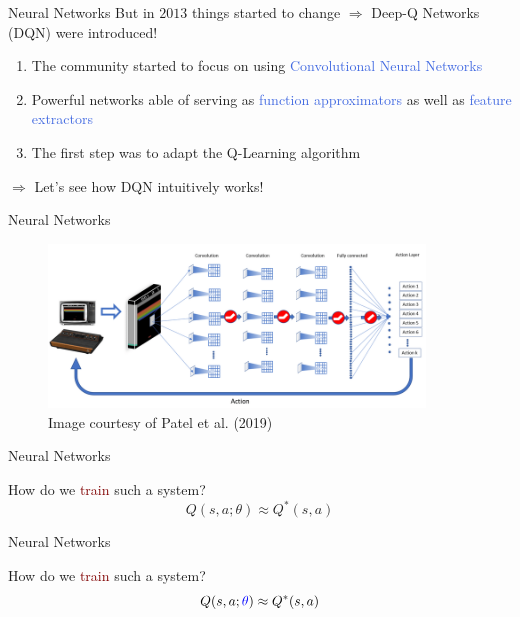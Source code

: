 \documentclass{beamer}
\begin{document}
\begin{frame}{Neural Networks}
	But in $2013$ things started to change $\Rightarrow$ \textcolor{skymagenta}{Deep-Q Networks} (DQN) were introduced!

	\begin{enumerate}
		\item The community started to focus on using \textcolor{RoyalBlue}{Convolutional Neural Networks}
		\item Powerful networks able of serving as \textcolor{RoyalBlue}{function approximators} as well as \textcolor{RoyalBlue}{feature extractors}
		\item The first step was to adapt the Q-Learning algorithm 
	\end{enumerate}
	
	\bigskip 

	$\Rightarrow$ Let's see how DQN intuitively works!

\end{frame}


\begin{frame}{Neural Networks}

	\begin{figure}
		\centering
		\includegraphics[width=10cm]{./Images/dqn}
		\caption{Image courtesy of Patel et al. (2019)}
	\end{figure}

\end{frame}

\begin{frame}{Neural Networks}
	\begin{center}
		How do we \textcolor{Maroon}{train} such a system?
		\begin{equation*}  
			Q(s,a;\theta)\approx Q^{*}(s,a)
		\end{equation*}
	\end{center}
\end{frame}



\begin{frame}{Neural Networks}
	\begin{center}
		How do we \textcolor{Maroon}{train} such a system?
		\begin{equation*}  
			Q(s,a; \textcolor{blue}{\theta})\approx Q^{*}(s,a)
		\end{equation*}
	\end{center}
\end{frame}
\end{document}
